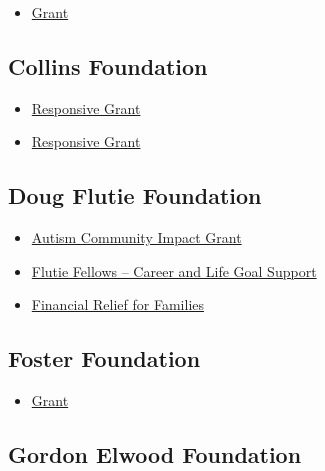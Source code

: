 \documentclass[
  letterpaper,
  DIV=11,
  numbers=noendperiod]{scrreprt}
\providecommand{\tightlist}{%
  \setlength{\itemsep}{0pt}\setlength{\parskip}{0pt}}\usepackage{longtable,booktabs,array}
\begin{document}
\begin{itemize}
\tightlist
\item
  \href{https://www.chambersfamilyfoundation.com/submissions}{Grant}
\end{itemize}

\subsection{Collins Foundation}\label{collins-foundation}

\begin{itemize}
\tightlist
\item
  \href{https://www.collinsfoundation.org/responsive-grantmaking-submission-guidelines}{Responsive
  Grant}
\item
  \href{https://www.collinsfoundation.org/responsive-grantmaking-submission-guidelines/frequently-asked-questions}{Responsive
  Grant}
\end{itemize}

\subsection{Doug Flutie Foundation}\label{doug-flutie-foundation}

\begin{itemize}
\tightlist
\item
  \href{https://flutiefoundation.org/helping-communities/autism-community-impact-grant/}{Autism
  Community Impact Grant}
\item
  \href{https://flutiefoundation.org/helping-individuals/flutie-fellows-career-and-life-goal-support/}{Flutie
  Fellows -- Career and Life Goal Support}
\item
  \href{https://flutiefoundation.org/helping-families/direct-financial-support/}{Financial
  Relief for Families}
\end{itemize}

\subsection{Foster Foundation}\label{foster-foundation}

\begin{itemize}
\tightlist
\item
  \href{http://www.thefosterfoundation.org/Home.htm}{Grant}
\end{itemize}

\subsection{Gordon Elwood Foundation}\label{gordon-elwood-foundation}
\end{document}
